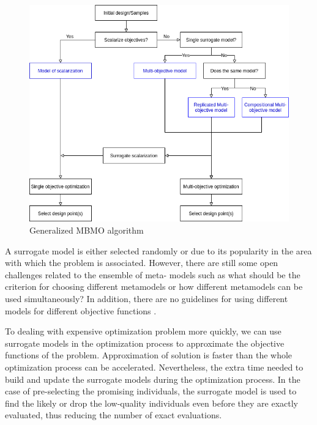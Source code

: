         \begin{figure}
            \centering
            \includegraphics[width=\textwidth]{content/images/mbmo.png}
            \caption[Generalized MBMO algorithm]{Generalized MBMO algorithm}
            \label{fig:generalMBMO}
        \end{figure}


        A surrogate model is either selected randomly or due to its popularity in the area with which the problem is associated.  However, there are still some open challenges related to the ensemble of meta- models such as what should be the criterion for choosing different metamodels or how different metamodels can be used simultaneously? In addition, there are no guidelines for using different models for different objective functions \cite{SoftSurvey}.

        \cite{EngSurMod} 

        To dealing with expensive optimization problem more quickly, we can use surrogate models in the optimization process to approximate the objective functions of the problem. Approximation of solution is faster than the whole optimization process can be accelerated. Nevertheless, the extra time needed to build and update the surrogate models during the optimization process. 
        In the case of pre-selecting the promising individuals, the surrogate model is used to find the likely or drop the low-quality individuals even before they are exactly evaluated, thus reducing the number of exact evaluations.

